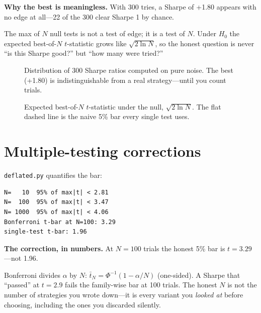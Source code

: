 \begin{example}\label{ex:max}
\textbf{Why the best is meaningless.} With 300 tries, a Sharpe of +1.80 appears with no
edge at all---22 of the 300 clear Sharpe 1 by chance.
\begin{solution}
The max of $N$ null tests is not a test of edge; it is a test of $N$. Under $H_0$ the
expected best-of-$N$ $t$-statistic grows like $\sqrt{2\ln N}$, so the honest question is
never ``is this Sharpe good?'' but ``how many were tried?''
\end{solution}
\end{example}

\begin{figure}[htbp]\centering

\caption{Distribution of 300 Sharpe ratios computed on pure noise. The best (+1.80) is
indistinguishable from a real strategy---until you count trials.}
\label{fig:shist}
\end{figure}

\begin{figure}[htbp]\centering

\caption{Expected best-of-$N$ $t$-statistic under the null, $\sqrt{2\ln N}$. The flat
dashed line is the naive 5\% bar every single test uses.}
\label{fig:bestn}
\end{figure}

\section{Multiple-testing corrections}\label{sec:mtcorr}

\texttt{deflated.py} quantifies the bar:
\begin{lstlisting}[numbers=none]
N=   10  95% of max|t| < 2.81
N=  100  95% of max|t| < 3.47
N= 1000  95% of max|t| < 4.06
Bonferroni t-bar at N=100: 3.29
single-test t-bar: 1.96
\end{lstlisting}

\begin{example}\label{ex:bonf}
\textbf{The correction, in numbers.} At $N{=}100$ trials the honest 5\% bar is
$t=3.29$---not 1.96.
\begin{solution}
Bonferroni divides $\alpha$ by $N$: $\bar t_N=\Phi^{-1}(1-\alpha/N)$ (one-sided). A Sharpe that
``passed'' at $t=2.9$ fails the family-wise bar at 100 trials. The honest $N$ is not the
number of strategies you wrote down---it is every variant you \emph{looked at} before
choosing, including the ones you discarded silently.
\end{solution}
\end{example}

